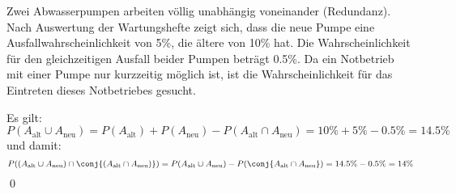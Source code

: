 \documentclass{abgabe}
\begin{document}
\newcommand{\Aalt}{A_{\text{alt}}}
\newcommand{\Aneu}{A_{\text{neu}}}

\begin{questions}
    \question
    Zwei Abwasserpumpen arbeiten völlig unabhängig voneinander (Redundanz). 
    Nach Auswertung der Wartungshefte zeigt sich, dass die neue Pumpe eine Ausfallwahrscheinlichkeit von 5\%, die ältere von 10\% hat. 
    Die Wahrscheinlichkeit für den gleichzeitigen Ausfall beider Pumpen beträgt 0.5\%.
    Da ein Notbetrieb mit einer Pumpe nur kurzzeitig möglich ist, ist die Wahrscheinlichkeit für das Eintreten dieses Notbetriebes gesucht.
    \begin{solution}
        Es gilt:  
        \[ 
            P(\Aalt \cup \Aneu) = P(\Aalt) + P(\Aneu) - P(\Aalt \cap \Aneu) = 10\% + 5\% - 0.5\% = 14.5\%
        \]
        und damit:
        \[ 
            P((\Aalt \cup \Aneu) \cap \conj{(\Aalt \cap \Aneu)}) = P(\Aalt \cup \Aneu) - P(\conj{\Aalt \cap \Aneu}) = 14.5\% - 0.5\% = 14\%
        \]
        \qed
    \end{solution}
\end{questions}
\end{document}
